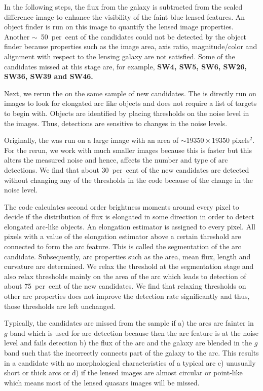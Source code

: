 \documentclass[useAMS,usenatbib,a4paper]{mn2e}
\begin{document}
In the following steps, the flux from the galaxy is subtracted from the
scaled difference image to enhance the visibility of the faint blue
lensed features. An object finder is run on this image to quantify the
lensed image properties. Another $\sim$~50~per~cent of the \sw candidates could not be
detected by the object finder because properties such as the image area,
axis ratio, magnitude/color and alignment with respect to the lensing
galaxy are not satisfied. Some of the candidates missed at this stage
are, for example, {\bf SW4, SW5, SW6, SW26, SW36, SW39 and SW46.}

Next, we rerun the \af on the same \sw sample of new candidates. The \af
is directly run on images to look for elongated arc like objects and does
not require a list of targets to begin with. Objects are identified by
placing thresholds on the noise level in the images. Thus, \af
detections are sensitive to changes in the noise levels.

Originally, the \af was run on a large image with an area of $\sim 19350
\times 19350$ pixels$^2$. For the rerun, we work with much smaller
images because this is faster but this alters the measured
noise and hence, affects the number and type of arc detections. We find
that about 30~per~cent of the new candidates are detected without changing any
of the thresholds in the code because of the change in the noise level.

The \af code calculates second order brightness moments around every
pixel to decide if the distribution of flux is elongated in some
direction in order to detect elongated arc-like objects. An elongation
estimator is assigned to every pixel. All pixels with a value of the
elongation estimator above a certain threshold are connected to form the arc
feature. This is called the segmentation of the arc candidate. Subsequently, arc
properties such as the area, mean flux, length and curvature are
determined. We relax the threshold at the segmentation stage and also relax
thresholds mainly on the area of the arc which leads to detection of
about 75~per~cent of the new \sw candidates. We find that relaxing thresholds
on other arc properties does not improve the detection rate significantly
and thus, those thresholds are left unchanged.

Typically, the candidates are missed from the \af sample if a) the arcs
are fainter in $g$ band which is used for arc detection because then the
arc feature is at the noise level and fails detection b) the flux of the
arc and the galaxy are blended in the $g$ band such that the \af
incorrectly connects part of the galaxy to the arc. This results in a
candidate with no morphological characteristics of a typical arc c)
unusually short or thick arcs or d) if the lensed images are almost
circular or point-like which means most of the lensed quasars images
will be missed.
\end{document}
